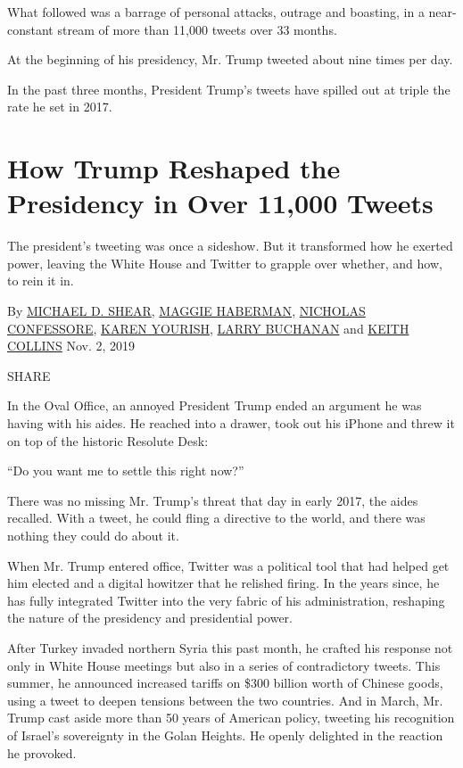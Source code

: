 What followed was a barrage of personal attacks, outrage and boasting,
in a near-constant stream of more than 11,000 tweets over 33 months.

At the beginning of his presidency, Mr. Trump tweeted about nine times
per day.

In the past three months, President Trump's tweets have spilled out at
triple the rate he set in 2017.

\hypertarget{how-trump-reshaped-the-presidency-in-over-11000-tweets-1}{%
\section{How Trump Reshaped the Presidency in Over 11,000
Tweets}\label{how-trump-reshaped-the-presidency-in-over-11000-tweets-1}}

The president's tweeting was once a sideshow. But it transformed how he
exerted power, leaving the White House and Twitter to grapple over
whether, and how, to rein it in.

By \href{https://www.nytimes.com/by/michael-d-shear}{MICHAEL D. SHEAR},
\href{https://www.nytimes.com/by/maggie-haberman}{MAGGIE HABERMAN},
\href{https://www.nytimes.com/by/nicholas-confessore}{NICHOLAS
CONFESSORE}, \href{https://www.nytimes.com/by/karen-yourish}{KAREN
YOURISH}, \href{https://www.nytimes.com/by/larry-buchanan}{LARRY
BUCHANAN} and \href{https://www.nytimes.com/by/keith-collins}{KEITH
COLLINS} Nov. 2, 2019

SHARE

In the Oval Office, an annoyed President Trump ended an argument he was
having with his aides. He reached into a drawer, took out his iPhone and
threw it on top of the historic Resolute Desk:

``Do you want me to settle this right now?''

There was no missing Mr. Trump's threat that day in early 2017, the
aides recalled. With a tweet, he could fling a directive to the world,
and there was nothing they could do about it.

When Mr. Trump entered office, Twitter was a political tool that had
helped get him elected and a digital howitzer that he relished firing.
In the years since, he has fully integrated Twitter into the very fabric
of his administration, reshaping the nature of the presidency and
presidential power.

After Turkey invaded northern Syria this past month, he crafted his
response not only in White House meetings but also in a series of
contradictory tweets. This summer, he announced increased tariffs on
\$300 billion worth of Chinese goods, using a tweet to deepen tensions
between the two countries. And in March, Mr. Trump cast aside more than
50 years of American policy, tweeting his recognition of Israel's
sovereignty in the Golan Heights. He openly delighted in the reaction he
provoked.

